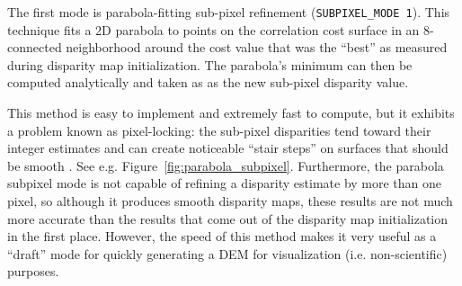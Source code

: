 The first mode is parabola-fitting sub-pixel refinement
(\texttt{SUBPIXEL\_MODE 1}).  This technique fits a 2D parabola to
points on the correlation cost surface in an 8-connected neighborhood
around the cost value that was the ``best'' as measured during
disparity map initialization. The parabola's minimum can then be
computed analytically and taken as as the new sub-pixel disparity
value.

This method is easy to implement and extremely fast to compute, but it
exhibits a problem known as pixel-locking: the sub-pixel disparities
tend toward their integer estimates and can create noticeable ``stair
steps'' on surfaces that should be
smooth \citep{Stein06:attenuating,Szeliski03sampling}.  See
e.g. Figure~\ref{fig:parabola_subpixel}. Furthermore, the parabola
subpixel mode is not capable of refining a disparity estimate by more
than one pixel, so although it produces smooth disparity maps, these
results are not much more accurate than the results that come out of
the disparity map initialization in the first place.  However, the
speed of this method makes it very useful as a ``draft'' mode for
quickly generating a \ac{DEM} for visualization (i.e. non-scientific)
purposes.

